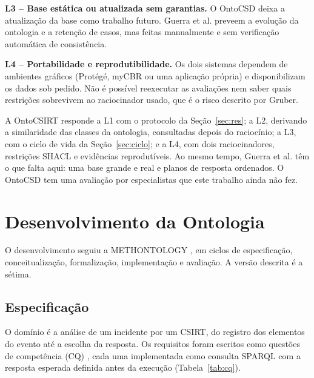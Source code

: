 \documentclass[12pt]{article}
\begin{document}
\textbf{L3 -- Base estática ou atualizada sem garantias.} O OntoCSD deixa a atualização da base como trabalho futuro. Guerra et al. preveem a evolução da ontologia e a retenção de casos, mas feitas manualmente e sem verificação automática de consistência.

\textbf{L4 -- Portabilidade e reprodutibilidade.} Os dois sistemas dependem de ambientes gráficos (Protégé, myCBR ou uma aplicação própria) e disponibilizam os dados sob pedido. Não é possível reexecutar as avaliações nem saber quais restrições sobrevivem ao raciocinador usado, que é o risco descrito por Gruber.

A OntoCSIRT responde a L1 com o protocolo da Seção~\ref{sec:res}; a L2, derivando a similaridade das classes da ontologia, consultadas depois do raciocínio; a L3, com o ciclo de vida da Seção~\ref{sec:ciclo}; e a L4, com dois raciocinadores, restrições SHACL e evidências reprodutíveis. Ao mesmo tempo, Guerra et al. têm o que falta aqui: uma base grande e real e planos de resposta ordenados. O OntoCSD tem uma avaliação por especialistas que este trabalho ainda não fez.

\section{Desenvolvimento da Ontologia}
\label{sec:dev}

O desenvolvimento seguiu a METHONTOLOGY \cite{methontology}, em ciclos de especificação, conceitualização, formalização, implementação e avaliação. A versão descrita é a sétima.

\subsection{Especificação}

O domínio é a análise de um incidente por um CSIRT, do registro dos elementos do evento até a escolha da resposta. Os requisitos foram escritos como questões de competência (CQ) \cite{gruninger1995}, cada uma implementada como consulta SPARQL \cite{sparql11} com a resposta esperada definida antes da execução (Tabela~\ref{tab:cq}).
\end{document}
